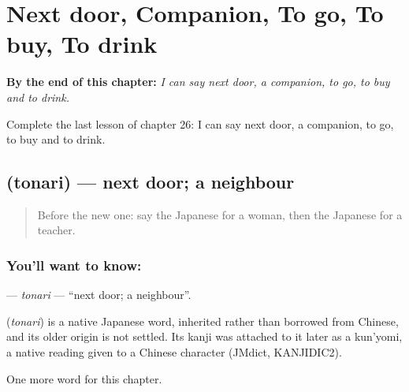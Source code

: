 
\chapter{Next door, Companion, To go, To buy, To drink}
\label{ch:ja-next-door-companion-to-go-to-buy-to-drink}

\begin{chapteropening}
\textbf{By the end of this chapter:} \emph{I can say next door, a companion, to go, to buy and to drink.}

Complete the last lesson of chapter 26: I can say next door, a companion, to go, to buy and to drink.
\end{chapteropening}

\section[\texorpdfstring{\ja{となり} (tonari)}{となり (tonari)}]{ (tonari) — next door; a neighbour}

\label{lesson:JA-C26-tonari}



\begin{quote}
Before the new one: say the Japanese for a woman, then the Japanese for a teacher.
\end{quote}

\subsection*{You'll want to know: }
\textbf{} — \emph{tonari} — \textquotedblleft{}next door; a neighbour\textquotedblright{}.

\begin{cousinweb}
\textbf{} (\emph{tonari}) is a native Japanese word, inherited rather than borrowed from Chinese, and its older origin is not settled. Its kanji was attached to it later as a kun'yomi, a native reading given to a Chinese character (JMdict, KANJIDIC2).
\end{cousinweb}

\begin{grammarlens}[title={What you've built}]
One more word for this chapter.
\end{grammarlens}

